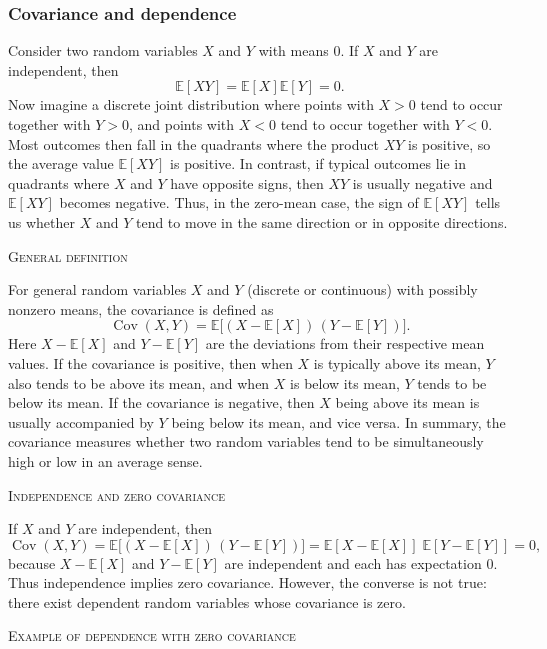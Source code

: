\subsubsection{Covariance and dependence}

Consider two random variables \(X\) and \(Y\) with means \(0\).  
If \(X\) and \(Y\) are independent, then
\[
\mathbb{E}[XY]
=
\mathbb{E}[X]\mathbb{E}[Y]
=
0.
\]
Now imagine a discrete joint distribution where points with \(X>0\) tend to occur together with \(Y>0\), and points with \(X<0\) tend to occur together with \(Y<0\).  
Most outcomes then fall in the quadrants where the product \(XY\) is positive, so the average value \(\mathbb{E}[XY]\) is positive.  
In contrast, if typical outcomes lie in quadrants where \(X\) and \(Y\) have opposite signs, then \(XY\) is usually negative and \(\mathbb{E}[XY]\) becomes negative.  
Thus, in the zero-mean case, the sign of \(\mathbb{E}[XY]\) tells us whether \(X\) and \(Y\) tend to move in the same direction or in opposite directions.

\bigskip
\textsc{General definition}

For general random variables \(X\) and \(Y\) (discrete or continuous) with possibly nonzero means, the covariance is defined as
\[
\operatorname{Cov}(X,Y)
=
\mathbb{E}\big[(X-\mathbb{E}[X])\,(Y-\mathbb{E}[Y])\big].
\]
Here \(X-\mathbb{E}[X]\) and \(Y-\mathbb{E}[Y]\) are the deviations from their respective mean values.  
If the covariance is positive, then when \(X\) is typically above its mean, \(Y\) also tends to be above its mean, and when \(X\) is below its mean, \(Y\) tends to be below its mean.  
If the covariance is negative, then \(X\) being above its mean is usually accompanied by \(Y\) being below its mean, and vice versa.  
In summary, the covariance measures whether two random variables tend to be simultaneously high or low in an average sense.

\bigskip
\textsc{Independence and zero covariance}

If \(X\) and \(Y\) are independent, then
\[
\operatorname{Cov}(X,Y)
=
\mathbb{E}\big[(X-\mathbb{E}[X])\,(Y-\mathbb{E}[Y])\big]
=
\mathbb{E}[X-\mathbb{E}[X]]\;\mathbb{E}[Y-\mathbb{E}[Y]]
=
0,
\]
because \(X-\mathbb{E}[X]\) and \(Y-\mathbb{E}[Y]\) are independent and each has expectation \(0\).  
Thus independence implies zero covariance.  
However, the converse is not true: there exist dependent random variables whose covariance is zero.

\bigskip
\textsc{Example of dependence with zero covariance}

